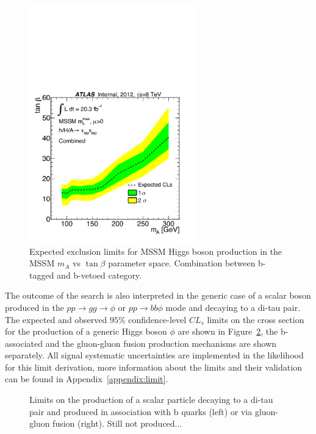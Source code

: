 \begin{figure}[tp]
  \centering
  \includegraphics[width=0.65\textwidth]{figure/limits/Limits_mAtanBeta_Comb.pdf}
  \caption{Expected %
  exclusion limits for MSSM Higgs boson production 
in the MSSM $m_A$ vs $\tan\beta$ parameter space. Combination between b-tagged and b-vetoed category.}
\label{fig:limit_extract_combined}
\end{figure}


The outcome of the search is also interpreted in the generic case of a scalar boson produced in the
$pp \rightarrow gg \rightarrow \phi$ or $pp \rightarrow bb\phi$ mode and decaying to a di-tau pair.
The expected and observed $95\%$ confidence-level $CL_s$  limits on the cross section for the production of 
a generic Higgs boson $\phi$ are shown in Figure~\ref{fig:limit_xs}, 
the b-associated  and the gluon-gluon fusion production mechanisms are shown separately.
All signal systematic uncertainties are implemented in the likelihood
for this limit derivation, more information about the limits and their validation can be found in Appendix~\ref{appendix:limit}.

\begin{figure}[tp]
  \centering
  \caption{ Limits on the production of a scalar particle decaying to a di-tau pair
    and produced     in association with b quarks (left) or   via gluon-gluon fusion (right). Still not produced...}
\label{fig:limit_xs}
\end{figure}

